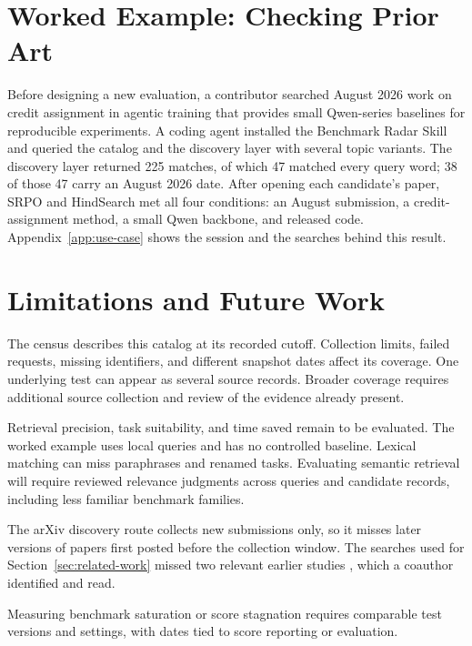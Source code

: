 \documentclass[11pt]{article}
\begin{document}
\section{Worked Example: Checking Prior Art}
\label{sec:worked-example}

Before designing a new evaluation, a contributor searched August 2026 work on credit assignment in agentic training that provides small Qwen-series baselines for reproducible experiments. A coding agent installed the Benchmark Radar Skill and queried the catalog and the discovery layer with several topic variants. The discovery layer returned 225 matches, of which 47 matched every query word; 38 of those 47 carry an August 2026 date. After opening each candidate's paper, SRPO and HindSearch met all four conditions: an August submission, a credit-assignment method, a small Qwen backbone, and released code. Appendix~\ref{app:use-case} shows the session and the searches behind this result.

\section{Limitations and Future Work}
\label{sec:caveat-future-work}

The census describes this catalog at its recorded cutoff. Collection limits, failed requests, missing identifiers, and different snapshot dates affect its coverage. One underlying test can appear as several source records. Broader coverage requires additional source collection and review of the evidence already present.

Retrieval precision, task suitability, and time saved remain to be evaluated. The worked example uses local queries and has no controlled baseline. Lexical matching can miss paraphrases and renamed tasks. Evaluating semantic retrieval \citep{reimers2019sentencebert} will require reviewed relevance judgments across queries and candidate records, including less familiar benchmark families.

The arXiv discovery route collects new submissions only, so it misses later versions of papers first posted before the collection window. The searches used for Section~\ref{sec:related-work} missed two relevant earlier studies \citep{yang2026benchmark,akhtar2026plateau}, which a coauthor identified and read.

Measuring benchmark saturation or score stagnation requires comparable test versions and settings, with dates tied to score reporting or evaluation.
\end{document}

